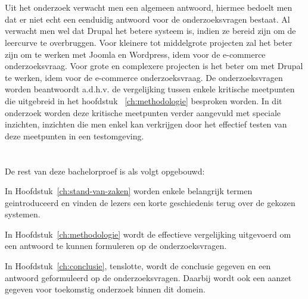 \section{}
\label{sec:onderzoeksdoelstelling}

Uit het onderzoek verwacht men een algemeen antwoord, hiermee bedoelt men dat er niet echt een eenduidig antwoord voor de onderzoeksvragen bestaat. Al verwacht men wel dat Drupal het betere systeem is, indien ze bereid zijn om de leercurve te overbruggen. Voor kleinere tot middelgrote projecten zal het beter zijn om te werken met Joomla en Wordpress, idem voor de e-commerce onderzoeksvraag. Voor grote en complexere projecten is het beter om met Drupal te werken, idem voor de e-commerce onderzoeksvraag. De onderzoeksvragen worden beantwoordt a.d.h.v. de vergelijking tussen enkele kritische meetpunten die uitgebreid in het hoofdstuk ~\ref{ch:methodologie} besproken worden. In dit onderzoek worden deze kritische meetpunten verder aangevuld met speciale inzichten, inzichten die men enkel kan verkrijgen door het effectief testen van deze meetpunten in een testomgeving.

\section{}
\label{sec:opzet-bachelorproef}


De rest van deze bachelorproef is als volgt opgebouwd:

In Hoofdstuk~\ref{ch:stand-van-zaken} worden enkele belangrijk termen geintroduceerd en vinden de lezers een korte geschiedenis terug over de gekozen systemen.

In Hoofdstuk~\ref{ch:methodologie} wordt de effectieve vergelijking uitgevoerd om een antwoord te kunnen formuleren op de onderzoeksvragen.


In Hoofdstuk~\ref{ch:conclusie}, tenslotte, wordt de conclusie gegeven en een antwoord geformuleerd op de onderzoeksvragen. Daarbij wordt ook een aanzet gegeven voor toekomstig onderzoek binnen dit domein.